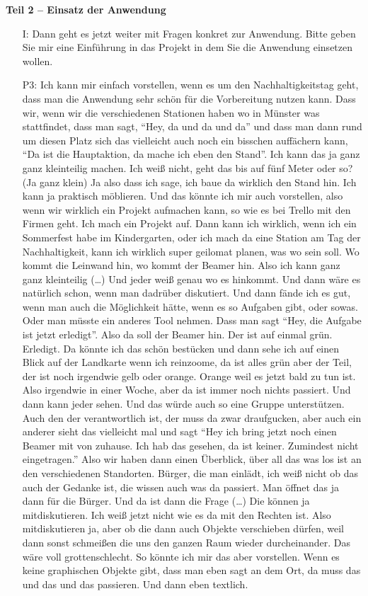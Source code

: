 \textbf{Teil 2 -- Einsatz der Anwendung}
\begin{itemize}
    \item[I:] Dann geht es jetzt weiter mit Fragen konkret zur Anwendung. Bitte geben Sie mir eine Einf{\"u}hrung in das Projekt in dem Sie die Anwendung einsetzen wollen.
    \item[P3:] Ich kann mir einfach vorstellen, wenn es um den Nachhaltigkeitstag geht, dass man die Anwendung sehr sch{\"o}n f{\"u}r die Vorbereitung nutzen kann. Dass wir, wenn wir die verschiedenen Stationen haben wo in M{\"u}nster was stattfindet, dass man sagt, "`Hey, da und da und da"' und dass man dann rund um diesen Platz sich das vielleicht auch noch ein bisschen auff{\"a}chern kann, "`Da ist die Hauptaktion, da mache ich eben den Stand"'. Ich kann das ja ganz ganz kleinteilig machen. Ich wei{\ss} nicht, geht das bis auf f{\"u}nf Meter oder so? (Ja ganz klein) Ja also dass ich sage, ich baue da wirklich den Stand hin. Ich kann ja praktisch m{\"o}blieren. Und das k{\"o}nnte ich mir auch vorstellen, also wenn wir wirklich ein Projekt aufmachen kann, so wie es bei Trello mit den Firmen geht. Ich mach ein Projekt auf. Dann kann ich wirklich, wenn ich ein Sommerfest habe im Kindergarten, oder ich mach da eine Station am Tag der Nachhaltigkeit, kann ich wirklich super geilomat planen, was wo sein soll. Wo kommt die Leinwand hin, wo kommt der Beamer hin. Also ich kann ganz ganz kleinteilig (\dots) Und jeder wei{\ss} genau wo es hinkommt. Und dann w{\"a}re es nat{\"u}rlich schon, wenn man dadr{\"u}ber diskutiert. Und dann f{\"a}nde ich es gut, wenn man auch die M{\"o}glichkeit h{\"a}tte, wenn es so Aufgaben gibt, oder sowas. Oder man m{\"u}sste ein anderes Tool nehmen. Dass man sagt "`Hey, die Aufgabe ist jetzt erledigt"'. Also da soll der Beamer hin. Der ist auf einmal gr{\"u}n. Erledigt. Da k{\"o}nnte ich das sch{\"o}n best{\"u}cken und dann sehe ich auf einen Blick auf der Landkarte wenn ich reinzoome, da ist alles gr{\"u}n aber der Teil, der ist noch irgendwie gelb oder orange. Orange weil es jetzt bald zu tun ist. Also irgendwie in einer Woche, aber da ist immer noch nichts passiert. Und dann kann jeder sehen. Und das w{\"u}rde auch so eine Gruppe unterst{\"u}tzen. Auch den der verantwortlich ist, der muss da zwar draufgucken, aber auch ein anderer sieht das vielleicht mal und sagt "`Hey ich bring jetzt noch einen Beamer mit von zuhause. Ich hab das gesehen, da ist keiner. Zumindest nicht eingetragen."' Also wir haben dann einen {\"U}berblick, {\"u}ber all das was los ist an den verschiedenen Standorten. B{\"u}rger, die man einl{\"a}dt, ich wei{\ss} nicht ob das auch der Gedanke ist, die wissen auch was da passiert. Man {\"o}ffnet das ja dann f{\"u}r die B{\"u}rger. Und da ist dann die Frage (\dots) Die k{\"o}nnen ja mitdiskutieren. Ich wei{\ss} jetzt nicht wie es da mit den Rechten ist. Also mitdiskutieren ja, aber ob die dann auch Objekte verschieben d{\"u}rfen, weil dann sonst schmei{\ss}en die uns den ganzen Raum wieder durcheinander. Das w{\"a}re voll grottenschlecht. So k{\"o}nnte ich mir das aber vorstellen. Wenn es keine graphischen Objekte gibt, dass man eben sagt an dem Ort, da muss das und das und das passieren. Und dann eben textlich.

\end{itemize}
